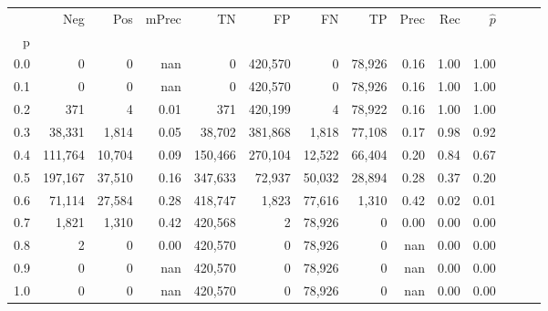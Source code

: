 \begin{tabular}{rrrrrrrrrrrrrr}
\toprule
{} &      Neg &     Pos & mPrec &       TN &       FP &      FN &      TP &  Prec &   Rec & $\hat{p}$ \\
p   &          &         &       &          &          &         &         &       &       &           \\
\midrule
0.0 &        0 &       0 &   nan &        0 &  420,570 &       0 &  78,926 &  0.16 &  1.00 &      1.00 \\
0.1 &        0 &       0 &   nan &        0 &  420,570 &       0 &  78,926 &  0.16 &  1.00 &      1.00 \\
0.2 &      371 &       4 &  0.01 &      371 &  420,199 &       4 &  78,922 &  0.16 &  1.00 &      1.00 \\
0.3 &   38,331 &   1,814 &  0.05 &   38,702 &  381,868 &   1,818 &  77,108 &  0.17 &  0.98 &      0.92 \\
0.4 &  111,764 &  10,704 &  0.09 &  150,466 &  270,104 &  12,522 &  66,404 &  0.20 &  0.84 &      0.67 \\
0.5 &  197,167 &  37,510 &  0.16 &  347,633 &   72,937 &  50,032 &  28,894 &  0.28 &  0.37 &      0.20 \\
0.6 &   71,114 &  27,584 &  0.28 &  418,747 &    1,823 &  77,616 &   1,310 &  0.42 &  0.02 &      0.01 \\
0.7 &    1,821 &   1,310 &  0.42 &  420,568 &        2 &  78,926 &       0 &  0.00 &  0.00 &      0.00 \\
0.8 &        2 &       0 &  0.00 &  420,570 &        0 &  78,926 &       0 &   nan &  0.00 &      0.00 \\
0.9 &        0 &       0 &   nan &  420,570 &        0 &  78,926 &       0 &   nan &  0.00 &      0.00 \\
1.0 &        0 &       0 &   nan &  420,570 &        0 &  78,926 &       0 &   nan &  0.00 &      0.00 \\
\bottomrule
\end{tabular}
